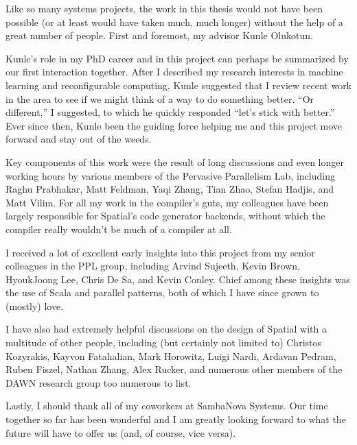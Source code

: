 Like so many systems projects, the work in this thesis would not have been
possible (or at least would have taken much, much longer) without the help of
a great number of people. First and foremost, my advisor Kunle Olukotun.

Kunle's role in my PhD career and in this project can perhaps be summarized by
our
first interaction together. After I described my research interests in machine
learning and reconfigurable computing, Kunle suggested that I review recent
work in the area to see if we might think of a way to do something better.
``Or different,'' I suggested, to which he quickly responded ``let's stick
with better.''  Ever since then, Kunle been the guiding force helping me and this
project move forward and stay out of the weeds.

Key components of this work were the result of long discussions and even longer
working hours by various members of the Pervasive Parallelism Lab, including
Raghu Prabhakar, Matt Feldman, Yaqi Zhang, Tian Zhao, Stefan Hadjis, and Matt
Vilim. For all my work in the compiler's guts, my colleagues have been largely
responsible for Spatial's code generator backends, without which the
compiler really wouldn't be much of a compiler at all.

I received a lot of excellent early insights into this project from my senior
colleagues in the PPL group, including Arvind Sujeeth, Kevin Brown, HyoukJoong
Lee, Chris De Sa, and Kevin Conley. Chief among these insights was the use of
Scala and parallel patterns, both of which I have since grown to (mostly) love.

I have also had extremely helpful discussions on the design of Spatial
with a multitude of other people, including (but certainly not limited to)
Christos Kozyrakis, Kayvon Fatahalian, Mark Horowitz,
Luigi Nardi, Ardavan Pedram, Ruben Fiszel, Nathan Zhang, Alex Rucker, and
numerous other members of the DAWN research group too numerous to list.

Lastly, I should thank all of my coworkers at SambaNova Systems. Our time
together so far has been wonderful and I am greatly looking forward to what
the future will have to offer us (and, of course, vice versa).
